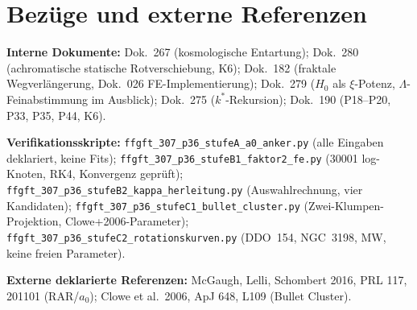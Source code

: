 \documentclass[11pt]{report}
\begin{document}
\chapter{Bezüge und externe Referenzen}

\textbf{Interne Dokumente:}
Dok.~267 (kosmologische Entartung);
Dok.~280 (achromatische statische Rotverschiebung, K6);
Dok.~182 (fraktale Wegverlängerung, Dok.~026 FE-Implementierung);
Dok.~279 ($H_0$ als $\xi$-Potenz, $\Lambda$-Feinabstimmung im Ausblick);
Dok.~275 ($k^*$-Rekursion);
Dok.~190 (P18--P20, P33, P35, P44, K6).

\medskip
\noindent\textbf{Verifikationsskripte:}
\texttt{ffgft\_307\_p36\_stufeA\_a0\_anker.py} (alle Eingaben deklariert, keine Fits);
\texttt{ffgft\_307\_p36\_stufeB1\_faktor2\_fe.py} (30001 log-Knoten, RK4, Konvergenz geprüft);
\texttt{ffgft\_307\_p36\_stufeB2\_kappa\_herleitung.py} (Auswahlrechnung, vier Kandidaten);
\texttt{ffgft\_307\_p36\_stufeC1\_bullet\_cluster.py} (Zwei-Klumpen-Projektion, Clowe+2006-Parameter);
\texttt{ffgft\_307\_p36\_stufeC2\_rotationskurven.py} (DDO~154, NGC~3198, MW, keine freien Parameter).

\medskip
\noindent\textbf{Externe deklarierte Referenzen:}
McGaugh, Lelli, Schombert 2016, PRL 117, 201101 (RAR/$a_0$);
Clowe et al.\ 2006, ApJ 648, L109 (Bullet Cluster).
\end{document}
